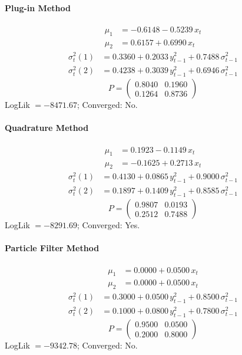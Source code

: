 \documentclass[11pt, a4paper]{article}
\begin{document}
\paragraph{Plug-in Method}
\begin{align}
\mu_{1} &= -0.6148 -0.5239\, x_t \\
\mu_{2} &= 0.6157 + 0.6990\, x_t
\end{align}
\begin{align}
\sigma^2_{t}(1) &= 0.3360 + 0.2033\, y_{t-1}^2 + 0.7488\, \sigma^2_{t-1} \\
\sigma^2_{t}(2) &= 0.4238 + 0.3039\, y_{t-1}^2 + 0.6946\, \sigma^2_{t-1}
\end{align}
\begin{equation}
P = \begin{pmatrix} 0.8040 & 0.1960 \\ 0.1264 & 0.8736 \end{pmatrix}
\end{equation}
LogLik $= -8471.67$; Converged: No.

\paragraph{Quadrature Method}
\begin{align}
\mu_{1} &= 0.1923 -0.1149\, x_t \\
\mu_{2} &= -0.1625 + 0.2713\, x_t
\end{align}
\begin{align}
\sigma^2_{t}(1) &= 0.4130 + 0.0865\, y_{t-1}^2 + 0.9000\, \sigma^2_{t-1} \\
\sigma^2_{t}(2) &= 0.1897 + 0.1409\, y_{t-1}^2 + 0.8585\, \sigma^2_{t-1}
\end{align}
\begin{equation}
P = \begin{pmatrix} 0.9807 & 0.0193 \\ 0.2512 & 0.7488 \end{pmatrix}
\end{equation}
LogLik $= -8291.69$; Converged: Yes.

\paragraph{Particle Filter Method}
\begin{align}
\mu_{1} &= 0.0000 + 0.0500\, x_t \\
\mu_{2} &= 0.0000 + 0.0500\, x_t
\end{align}
\begin{align}
\sigma^2_{t}(1) &= 0.3000 + 0.0500\, y_{t-1}^2 + 0.8500\, \sigma^2_{t-1} \\
\sigma^2_{t}(2) &= 0.1000 + 0.0800\, y_{t-1}^2 + 0.7800\, \sigma^2_{t-1}
\end{align}
\begin{equation}
P = \begin{pmatrix} 0.9500 & 0.0500 \\ 0.2000 & 0.8000 \end{pmatrix}
\end{equation}
LogLik $= -9342.78$; Converged: No.
\end{document}
